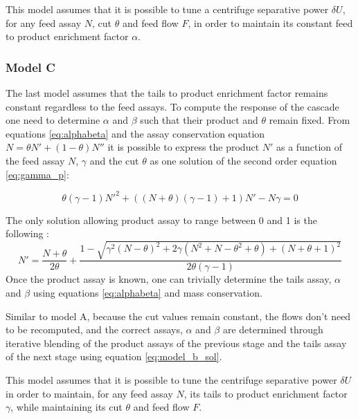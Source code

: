 This model assumes that it is possible to tune a centrifuge separative power
$\delta U$, for any feed assay $N$, cut $\theta$ and feed flow $F$, in order to
maintain its constant feed to product enrichment factor $\alpha$.




\subsubsection{Model C}
The last model assumes that the tails to product enrichment factor remains
constant regardless to the feed assays. To compute the response of the cascade
one need to determine $\alpha$ and $\beta$ such that their product and
$\theta$ remain fixed. 
From equations \eqref{eq:alphabeta} and the assay conservation equation $N =
\theta N' + (1-\theta)N''$ it is possible to express the product $N'$ as a function of
the feed assay $N$, $\gamma$ and the cut $\theta$ as one solution of the second
order equation \eqref{eq:gamma_p}:

\begin{equation}\label{eq:gamma_p}
    \theta(\gamma-1)N'^2+((N+\theta)(\gamma-1)+1)N'-N\gamma = 0
\end{equation}


The only solution allowing product assay to range between 0 and 1 is the
following :
\begin{equation}\label{eq:model_b_sol}
    N' = \frac{N+\theta}{2\theta} +
         \frac{1 - \sqrt{\gamma^{2}(N-\theta)^{2}
                         + 2\gamma( N^{2} + N - \theta^{2} + \theta)
                         + (N + \theta + 1)^{2}}}
              {2\theta(\gamma - 1)}
\end{equation}
Once the product assay is known, one can trivially determine the tails assay,
$\alpha$ and $\beta$ using equations \eqref{eq:alphabeta} and mass
conservation.

Similar to model A, because the cut values remain constant, the flows don't
need to be recomputed, and the correct assays, $\alpha$ and $\beta$ are
determined through iterative blending of the product assays of the previous
stage and the tails assay of the next stage using equation
\eqref{eq:model_b_sol}.

This model assumes that it is possible to tune the centrifuge separative power
$\delta U$ in order to maintain, for any feed assay $N$, its tails to product
enrichment factor $\gamma$, while maintaining its cut $\theta$ and feed flow
$F$.

